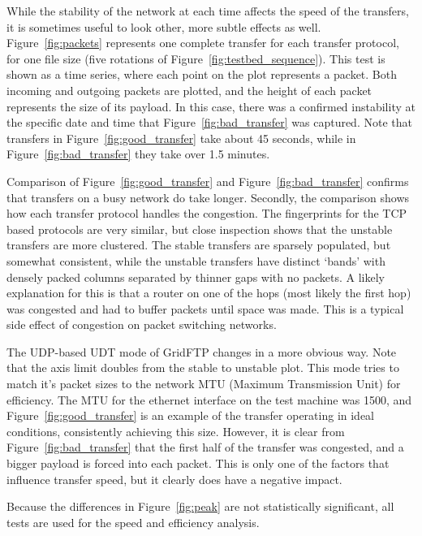 \documentclass{sig-alternate-05-2015}
\begin{document}
While the stability of the network at each time affects the speed of the transfers, it is sometimes useful to look other, more subtle effects as well. 
Figure~\ref{fig:packets} represents  one complete transfer for each transfer protocol, for one file size (five rotations of Figure~\ref{fig:testbed_sequence}). This test is shown as a time series, where each point on the plot represents a packet. Both incoming and outgoing packets are plotted, and the height of each packet represents the size of its payload. In this case, there was a confirmed instability at the specific date and time that Figure~\ref{fig:bad_transfer} was captured. Note that transfers in Figure~\ref{fig:good_transfer} take about 45 seconds, while in Figure~\ref{fig:bad_transfer} they take over 1.5 minutes.

Comparison of Figure~\ref{fig:good_transfer} and Figure~\ref{fig:bad_transfer} confirms that transfers on a busy network do take longer. Secondly, the comparison shows how each transfer protocol handles the congestion. The fingerprints for the TCP based protocols are very similar, but close inspection shows that the unstable transfers are more clustered. The stable transfers are sparsely populated, but somewhat consistent, while the unstable transfers have distinct `bands' with densely packed columns separated by thinner gaps with no packets. A likely explanation for this is that a router on one of the hops (most likely the first hop) was congested and had to buffer packets until space was made. This is a typical side effect of congestion on packet switching networks.

The UDP-based UDT mode of GridFTP changes in a more obvious way. Note that the axis limit doubles from the stable to unstable plot. This mode tries to match it's packet sizes to the network MTU (Maximum Transmission Unit) for efficiency. The MTU for the ethernet interface on the test machine was 1500, and Figure~\ref{fig:good_transfer} is an example of the transfer operating in ideal conditions, consistently achieving this size. However, it is clear from Figure~\ref{fig:bad_transfer} that the first half of the transfer was congested, and a bigger payload is forced into each packet. This is only one of the factors that influence transfer speed, but it clearly does have a negative impact.

Because the differences in Figure~\ref{fig:peak} are not statistically significant, all tests are used for the speed and efficiency analysis.
\end{document}
